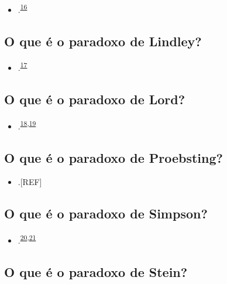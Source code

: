 \documentclass[
  a4paper,
]{book}
\providecommand{\tightlist}{%
  \setlength{\itemsep}{0pt}\setlength{\parskip}{0pt}}
\begin{document}
\begin{itemize}
\tightlist
\item
  .\textsuperscript{\protect\hyperlink{ref-hand1992}{16}}
\end{itemize}

\hypertarget{lindley}{%
\subsection{O que é o paradoxo de Lindley?}\label{lindley}}

\begin{itemize}
\tightlist
\item
  .\textsuperscript{\protect\hyperlink{ref-lindley1957}{17}}
\end{itemize}

\hypertarget{lord}{%
\subsection{O que é o paradoxo de Lord?}\label{lord}}

\begin{itemize}
\tightlist
\item
  .\textsuperscript{\protect\hyperlink{ref-lord1967}{18},\protect\hyperlink{ref-lord1969}{19}}
\end{itemize}

\hypertarget{proebsting}{%
\subsection{O que é o paradoxo de Proebsting?}\label{proebsting}}

\begin{itemize}
\tightlist
\item
  .{[}REF{]}
\end{itemize}

\hypertarget{simpson}{%
\subsection{O que é o paradoxo de Simpson?}\label{simpson}}

\begin{itemize}
\tightlist
\item
  .\textsuperscript{\protect\hyperlink{ref-simpson1951}{20},\protect\hyperlink{ref-blyth1972}{21}}
\end{itemize}

\hypertarget{stein}{%
\subsection{O que é o paradoxo de Stein?}\label{stein}}
\end{document}
